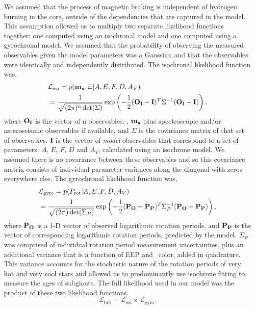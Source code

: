 We assumed that the process of magnetic braking is independent of hydrogen
burning in the core, outside of the dependencies that are captured in the
model.
This assumption allowed us to multiply two separate likelihood
functions together: one computed using an isochronal model and one computed
using a gyrochronal model.
We assumed that the probability of observing the measured observables given
the model parameters was a Gaussian and that the observables were identically
and independently distributed.
The isochronal likelihood function was,
\begin{eqnarray} \label{eqn:isochrones_only_likelihood}
    & \mathcal{L_{\mathrm{iso}}} = p({\bf m_x},
    \bar{\omega}|A, E, F, D,
    A_V) \\ \nonumber
    & = \frac{1}{\sqrt{(2\pi)^n \det(\Sigma)}}
    \exp\left( -\frac{1}{2} ({\bf O_I} - {\bf I})^T \Sigma ^{-1}
    ({\bf O_I} - {\bf I})\right),
\end{eqnarray}
where ${\bf O_I}$ is the vector of n observables: \pmega, ${\bf m_x}$ plus
spectroscopic and/or asteroseismic observables if available, and $\Sigma$ is
the covariance matrix of that set of observables.
${\bf I}$ is the vector of {\it model} observables that correspond to a set of
parameters: $A$, $E$, $F$, $D$ and $A_V$, calculated using an isochrone model.
We assumed there is no covariance between these observables and so this
covariance matrix consists of individual parameter variances along the
diagonal with zeros everywhere else.
The gyrochronal likelihood function was,
\begin{eqnarray} \label{eqn:gyro_likelihood}
    & \mathcal{L_{\mathrm{gyro}}} = p(P_\mathrm{rot} |A, E, F, D, A_V) \\ \nonumber
    & = \frac{1}{\sqrt{(2\pi) \det(\Sigma_P)}}
    \exp\left( -\frac{1}{2} ({\bf P_O} - {\bf P_P})^T \Sigma_P ^{-1}
    ({\bf P_O} - {\bf P_P})\right),
\end{eqnarray}
where ${\bf P_O}$ is a 1-D vector of observed logarithmic rotation periods,
and ${\bf P_P}$ is the vector of corresponding logarithmic rotation periods,
predicted by the model.
$\Sigma_P$ was comprised of individual rotation period measurement
uncertainties, plus an additional variance that is a function of EEP and
\gcolor\
color, added in quadrature.
This variance accounts for the stochastic nature of the rotation periods of
very hot and very cool stars and allowed us to predominantly use isochrone
fitting to measure the ages of subgiants.
The full likelihood used in our model was the product of these two likelihood
functions,
\begin{equation}
    \mathcal{L}_{\mathrm{full}} = \mathcal{L}_{\mathrm{iso}} \times
    \mathcal{L}_{\mathrm{gyro}}.
\end{equation}

